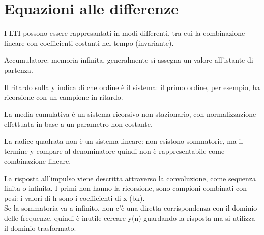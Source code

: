 \section{Equazioni alle differenze}
I LTI possono essere rappresantati in modi differenti, tra cui la combinazione lineare con coefficienti costanti nel tempo (invariante). 

Accumulatore: memoria infinita, generalmente si assegna un valore all'istante di partenza. 

Il ritardo sulla y indica di che ordine è il sistema: il primo ordine, per esempio, ha ricorsione con un campione in ritardo. 

La media cumulativa è un sistema ricorsivo non stazionario, con normalizzazione effettuata in base a un parametro non costante. 

La radice quadrata non è un sistema lineare: non esistono sommatorie, ma il termine y compare al denominatore quindi non è rappresentabile come combinazione lineare. 

La risposta all'impulso viene descritta attraverso la convoluzione, come sequenza finita o infinita. I primi non hanno la ricorsione, sono campioni combinati con pesi: i valori di h sono i coefficienti di x (bk). \\
Se la sommatoria va a infinito, non c'è una diretta corrispondenza con il dominio delle frequenze, quindi è inutile cercare y(n) guardando la risposta ma si utilizza il dominio trasformato.